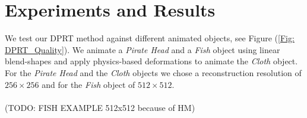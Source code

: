 \section{Experiments and Results}
We test our DPRT method against different animated objects,  see Figure (\ref{Fig: DPRT_Quality}). We animate a \textit{Pirate Head} and a \textit{Fish} object using linear blend-shapes and apply physics-based deformations to animate the \textit{Cloth} object.\\ 
For the \textit{Pirate Head} and the \textit{Cloth} objects we chose a reconstruction resolution of $256 \times 256$ and for the \textit{Fish } object of $512 \times 512$.
\\
\\
(TODO: FISH EXAMPLE 512x512 because of HM)
